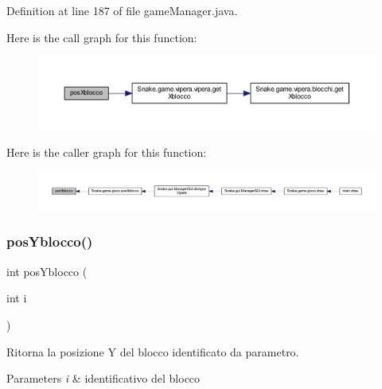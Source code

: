 Definition at line 187 of file game\+Manager.\+java.

Here is the call graph for this function\+:
\nopagebreak
\begin{figure}[H]
\begin{center}
\leavevmode
\includegraphics[width=350pt]{class_snake_1_1game_1_1utility_1_1game_manager_a88318c562485640585510cbd35e76b07_cgraph}
\end{center}
\end{figure}
Here is the caller graph for this function\+:
\nopagebreak
\begin{figure}[H]
\begin{center}
\leavevmode
\includegraphics[width=350pt]{class_snake_1_1game_1_1utility_1_1game_manager_a88318c562485640585510cbd35e76b07_icgraph}
\end{center}
\end{figure}
\mbox{\label{class_snake_1_1game_1_1utility_1_1game_manager_ac26b1474a291f2f7546e2e1cda1410b8}} 
\subsubsection{\texorpdfstring{pos\+Yblocco()}{posYblocco()}}
{\footnotesize\ttfamily int pos\+Yblocco (\begin{DoxyParamCaption}\item[{int}]{i }\end{DoxyParamCaption})}



Ritorna la posizione Y del blocco identificato da parametro. 


\begin{DoxyParams}{Parameters}
{\em i} & identificativo del blocco \\
\hline
\end{DoxyParams}


